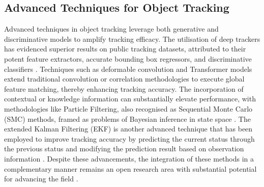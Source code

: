 \documentclass[12pt,oneside]{book} %
\begin{document}
\subsection{Advanced Techniques for Object Tracking}
Advanced techniques in object tracking leverage both generative and
discriminative models to amplify tracking efficacy. The utilisation of deep
trackers has evidenced superior results on public tracking datasets, attributed
to their potent feature extractors, accurate bounding box regressors, and
discriminative classifiers \cite{SurveyTransformersSingleOT}. Techniques such
as deformable convolution and Transformer models extend traditional convolution
or correlation methodologies to execute global feature matching, thereby
enhancing tracking accuracy. The incorporation of contextual or knowledge
information can substantially elevate performance, with methodologies like
Particle Filtering, also recognised as Sequential Monte Carlo (SMC) methods,
framed as problems of Bayesian inference in state space
\cite{SurveySmallObjectDetection, SmallObjectDetectionPositonPrediction}. The
extended Kalman Filtering (EKF) is another advanced technique that has been
employed to improve tracking accuracy by predicting the current status through
the previous status and modifying the prediction result based on observation
information \cite{SuveyAdvancesSingleOTMethods, SurveyModernODModels}. Despite
these advancements, the integration of these methods in a complementary manner
remains an open research area with substantial potential for advancing the
field \cite{OverviewCorrelationAlgoOT, SuveyAdvancesSingleOTMethods}.
\end{document}

